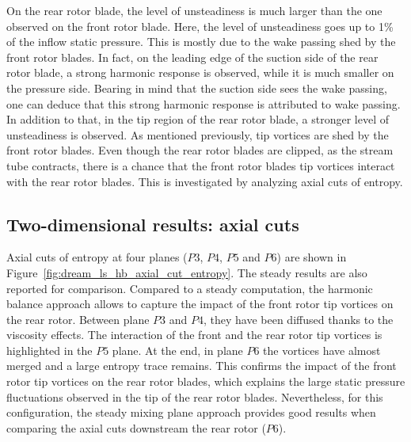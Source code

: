 On the rear rotor blade, the level
of unsteadiness is much larger than the one observed on
the front rotor blade. 
Here, the level of unsteadiness
goes up to 1\% of the inflow static pressure.
This is mostly due to the wake passing
shed by the front rotor blades. In fact, on the leading
edge of the suction side of the rear rotor blade, 
a strong harmonic response is observed, while it is 
much smaller on the pressure side. Bearing in mind that 
the suction side sees the wake passing, one can deduce
that this strong harmonic response is attributed to wake passing.
In addition to that, in the tip region of the rear rotor blade, 
a stronger level of unsteadiness is observed. As mentioned
previously, tip vortices are shed by the front rotor blades.
Even though the rear rotor blades are clipped, as 
the stream tube contracts, there is a chance that
the front rotor blades tip vortices interact with the 
rear rotor blades. This is investigated by analyzing
axial cuts of entropy.

\subsection{Two-dimensional results: axial cuts}
\label{sub:dream_ls_hb_axial_cuts}

Axial cuts of entropy at four planes ($P3$, $P4$, $P5$ and $P6$)
are shown in Figure~\ref{fig:dream_ls_hb_axial_cut_entropy}.
The steady results are also reported for comparison.
Compared to a steady computation, the harmonic balance
approach allows to capture the impact of the front rotor
tip vortices on the rear rotor. Between plane $P3$
and $P4$, they have been diffused thanks to the viscosity effects.
The interaction of the front and the rear rotor tip vortices
is highlighted in the $P5$ plane. At the end, in plane $P6$
the vortices have almost merged and a large entropy
trace remains. This confirms the impact
of the front rotor tip vortices on the
rear rotor blades, which explains the large static pressure
fluctuations observed in the tip of the rear 
rotor blades. Nevertheless, for this
configuration, the steady mixing plane approach 
provides good results when comparing the axial
cuts downstream the rear rotor ($P6$).

